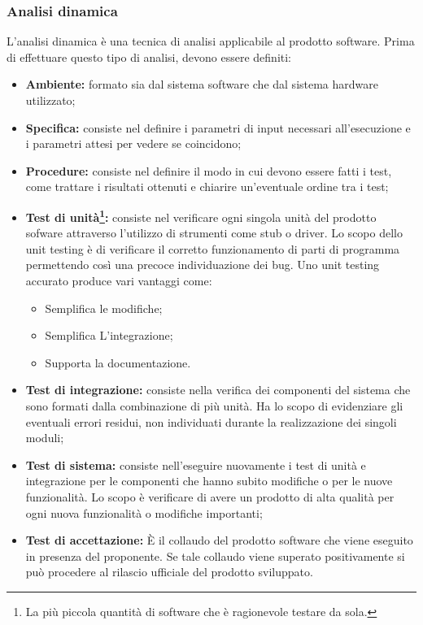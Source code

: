 	\subsubsection{Analisi dinamica}
	L'analisi dinamica è una tecnica di analisi applicabile al prodotto software. 
	Prima di effettuare questo tipo di analisi, devono essere definiti:
	\begin{itemize}
		\item \textbf{Ambiente:} formato sia dal sistema software che dal sistema hardware utilizzato;
		\item \textbf{Specifica:} consiste nel definire i parametri di input necessari all'esecuzione e i parametri attesi per vedere se coincidono;
		\item \textbf{Procedure:} consiste nel definire il modo in cui devono essere fatti i test, come trattare i risultati ottenuti e chiarire un'eventuale ordine tra i test;
		\item \textbf{Test di unità\footnote{La più piccola quantità di software che è ragionevole testare da sola.}:} consiste nel verificare ogni singola unità del prodotto sofware attraverso l'utilizzo di strumenti come stub o driver. Lo scopo dello unit testing è di verificare il corretto funzionamento di parti di programma permettendo così una precoce individuazione dei bug. Uno unit testing accurato produce vari vantaggi come:
			\begin{itemize}
				\item Semplifica le modifiche;
				\item Semplifica L'integrazione;
				\item Supporta la documentazione.
			\end{itemize}
		\item \textbf{Test di integrazione:} consiste nella verifica dei componenti del sistema che sono formati dalla combinazione di più unità. Ha lo scopo di evidenziare gli eventuali errori residui, non individuati durante la realizzazione dei singoli moduli;
		\item \textbf{Test di sistema:} consiste nell'eseguire nuovamente i test di unità e integrazione per le componenti che hanno subito modifiche o per le nuove funzionalità. Lo scopo è verificare di avere un prodotto di alta qualità per ogni nuova funzionalità o modifiche importanti;
		\item \textbf{Test di accettazione:} È il collaudo del prodotto software che viene eseguito in presenza del proponente. Se tale collaudo viene superato positivamente si può procedere al rilascio ufficiale del prodotto sviluppato.
	\end{itemize}
\newpage

